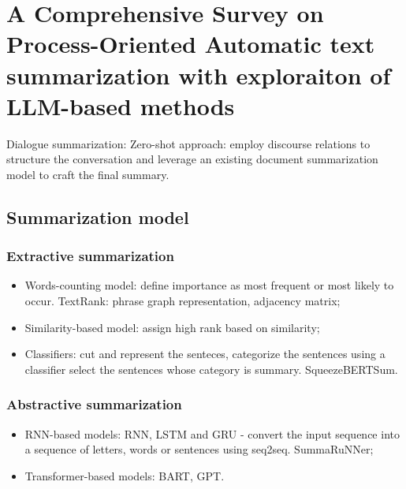 \documentclass[12pt]{article}
\begin{document}
\section{A Comprehensive Survey on Process-Oriented Automatic text summarization with exploraiton of LLM-based methods}
Dialogue summarization: Zero-shot approach: employ discourse relations to structure the conversation and leverage an existing document summarization model to craft the final summary. 
\subsection{Summarization model}
\subsubsection{Extractive summarization}
\begin{itemize}
    \item Words-counting model: define importance as most frequent or most likely to occur. TextRank: phrase graph representation, adjacency matrix;
    \item Similarity-based model: assign high rank based on similarity;
    \item Classifiers: cut and represent the senteces, categorize the sentences using a classifier select the sentences whose category is summary. SqueezeBERTSum.
\end{itemize}
\subsubsection{Abstractive summarization}
\begin{itemize}
    \item RNN-based models: RNN, LSTM and GRU - convert the input sequence into a sequence of letters, words or sentences using seq2seq. SummaRuNNer;
    \item Transformer-based models: BART, GPT.
\end{itemize}
\end{document}
